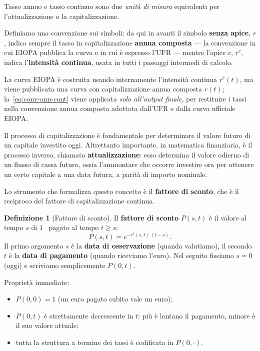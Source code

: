 \documentclass[11pt,a4paper]{article}
\theoremstyle{plain}
\theoremstyle{definition}
\newtheorem{definizione}[teorema]{Definizione}
\theoremstyle{remark}
\newcommand{\UFR}{\mathrm{UFR}}
\begin{document}
Tasso annuo e tasso continuo sono due \emph{unit\`a di misura} equivalenti per
l'attualizzazione o la capitalizzazione.

Definiamo una convenzione sui simboli: da qui in avanti il simbolo \textbf{senza apice}, $r$, indica sempre il tasso in
capitalizzazione \textbf{annua composta} --- la convenzione in cui EIOPA pubblica la curva e
in cui \`e espresso l'$\UFR$ --- mentre l'apice $c$, $r^c$, indica l'\textbf{intensit\`a
continua}, usata in tutti i passaggi intermedi di calcolo.


La curva EIOPA \`e costruita usando internamente l'intensit\`a continua $r^c(t)$, ma viene pubblicata una curva con capitalizzazione annua composta $r(t)$;
la~\eqref{eq:conv-ann-cont} viene applicata \emph{solo all'output finale}, per
restituire i tassi nella convenzione annua composta adottata dall'$\UFR$ e dalla curva
ufficiale EIOPA.

Il processo di capitalizzazione \`e fondamentale per determinare il valore futuro di un capitale investito oggi.
Altrettanto importante, in matematica finanziaria, \`e il processo inverso, chiamato
\textbf{attualizzazione}: esso determina il valore odierno di un
flusso di cassa futuro, ossia l'ammontare che occorre investire ora per ottenere un certo capitale
a una data futura, a parit\`a di importo nominale.

Lo strumento che formalizza questo concetto \`e il \textbf{fattore di sconto}, che è il reciproco
del fattore di capitalizzazione continua.

\begin{definizione}[Fattore di sconto]
\label{def:sconto}
Il \textbf{fattore di sconto} $P(s,t)$ \`e il valore al tempo $s$ di $1$~\texteuro{}
pagato al tempo $t \ge s$:
\[
  P(s,t) = e^{-r^c(s,t)\,(t-s)}.
\]
Il primo argomento $s$ \`e la \textbf{data di osservazione} (quando valutiamo), il secondo
$t$ \`e la \textbf{data di pagamento} (quando riceviamo l'euro). Nel seguito fissiamo
$s = 0$ (oggi) e scriviamo semplicemente $P(0,t)$.

Propriet\`a immediate:
\begin{itemize}
  \item $P(0,0) = 1$ (un euro pagato subito vale un euro);
  \item $P(0,t)$ \`e strettamente decrescente in $t$: pi\`u \`e lontano il pagamento, minore \`e il suo valore attuale;
  \item tutta la struttura a termine dei tassi \`e codificata in $P(0,\cdot)$.
\end{itemize}
\end{definizione}
\end{document}
